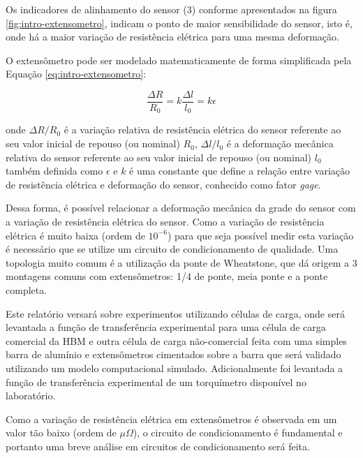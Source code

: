 \documentclass[a4paper]{instrumentacao}
\begin{document}
Os indicadores de alinhamento do sensor (3) conforme apresentados na figura \ref{fig:intro-extensometro}, indicam o ponto de maior sensibilidade do sensor, isto é, onde há a maior variação de resistência elétrica para uma mesma deformação.

O extensômetro pode ser modelado matematicamente de forma simplificada pela Equação \ref{eq:intro-extensometro}:

\begin{equation}
	\frac{\Delta R}{R_0} = k \frac{\Delta l}{l_0} = k\epsilon
	\label {eq:intro-extensometro}
\end{equation}

\noindent onde $\Delta R/R_0$ é a variação relativa de resistência elétrica do sensor referente ao seu valor inicial de repouso (ou nominal) $R_0$, $\Delta l/l_0$ é a deformação mecânica relativa do sensor referente ao seu valor inicial de repouso (ou nominal) $l_0$ também definida como $\epsilon$ e $k$ é uma constante que define a relação entre variação de resistência elétrica e deformação do sensor, conhecido como fator \textit{gage}.

Dessa forma, é possível relacionar a deformação mecânica da grade do sensor com a variação de resistência elétrica do sensor. Como a variação de resistência elétrica é muito baixa (ordem de $10^{-6}$) para que seja possível medir esta variação é necessário que se utilize um circuito de condicionamento de qualidade. Uma topologia muito comum é a utilização da ponte de Wheatstone, que dá origem a 3 montagens comuns com extensômetros: 1/4 de ponte, meia ponte e a ponte completa.

Este relatório versará sobre experimentos utilizando células de carga, onde será levantada a função de transferência experimental para uma célula de carga comercial da HBM e outra célula de carga não-comercial feita com uma simples barra de alumínio e extensômetros cimentados sobre a barra que será validado utilizando um modelo computacional simulado. Adicionalmente foi levantada a função de transferência experimental de um torquímetro disponível no laboratório.

Como a variação de resistência elétrica em extensômetros é observada em um valor tão baixo (ordem de $\mu\Omega$), o circuito de condicionamento é fundamental e portanto uma breve análise em circuitos de condicionamento será feita.
\end{document}
